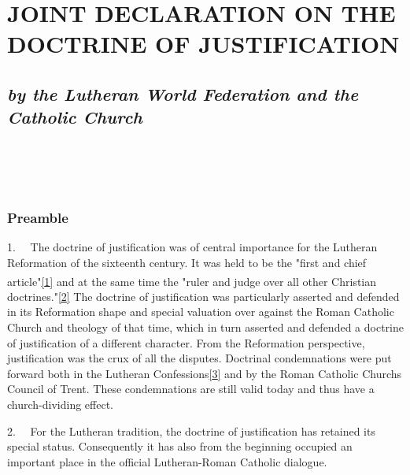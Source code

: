 \section{JOINT DECLARATION ON THE DOCTRINE OF
JUSTIFICATION}\label{joint-declaration-on-the-doctrine-of-justification}

\subsection{\texorpdfstring{\emph{by the Lutheran World Federation and
the Catholic
Church}}{by the Lutheran World Federation and the Catholic Church}}\label{by-the-lutheran-world-federation-and-the-catholic-church}

\section{~}\label{section}

\subsubsection{Preamble}\label{preamble}

1.~ ~The doctrine of justification was of central importance for the
Lutheran Reformation of the sixteenth century. It was held to be the
"first and chief
article"\label{r1}{}\hyperref[1]{{[}1{]}}
\textsuperscript{} and at the same time the "ruler and judge over all
other Christian
doctrines."\label{r2}{}\hyperref[2]{{[}2{]}} The doctrine
of justification was particularly asserted and defended in its
Reformation shape and special valuation over against the Roman Catholic
Church and theology of that time, which in turn asserted and defended a
doctrine of justification of a different character. From the Reformation
perspective, justification was the crux of all the disputes. Doctrinal
condemnations were put forward both in the Lutheran
Confessions\label{r3}{}\hyperref[3]{{[}3{]}} and by the
Roman Catholic Church\textquotesingle s Council of Trent. These
condemnations are still valid today and thus have a church-dividing
effect.

2.~ ~For the Lutheran tradition, the doctrine of justification has
retained its special status. Consequently it has also from the beginning
occupied an important place in the official Lutheran-Roman Catholic
dialogue.


